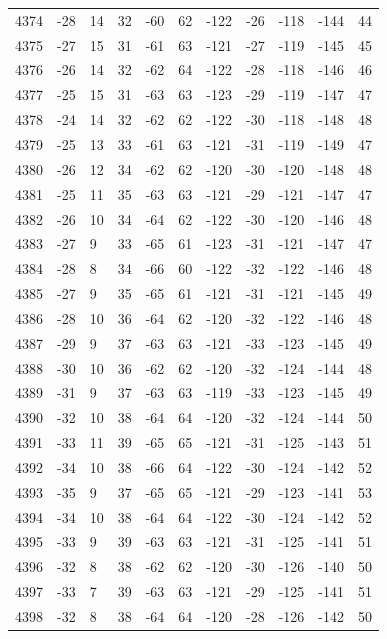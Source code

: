 \begin{table}[H]
\begin{tabular}{lllllllllll}
4374 & -28 & 14 & 32 & -60 & 62 & -122 & -26 & -118 & -144 & 44 \\
4375 & -27 & 15 & 31 & -61 & 63 & -121 & -27 & -119 & -145 & 45 \\
4376 & -26 & 14 & 32 & -62 & 64 & -122 & -28 & -118 & -146 & 46 \\
4377 & -25 & 15 & 31 & -63 & 63 & -123 & -29 & -119 & -147 & 47 \\
4378 & -24 & 14 & 32 & -62 & 62 & -122 & -30 & -118 & -148 & 48 \\
4379 & -25 & 13 & 33 & -61 & 63 & -121 & -31 & -119 & -149 & 47 \\
4380 & -26 & 12 & 34 & -62 & 62 & -120 & -30 & -120 & -148 & 48 \\
4381 & -25 & 11 & 35 & -63 & 63 & -121 & -29 & -121 & -147 & 47 \\
4382 & -26 & 10 & 34 & -64 & 62 & -122 & -30 & -120 & -146 & 48 \\
4383 & -27 & 9 & 33 & -65 & 61 & -123 & -31 & -121 & -147 & 47 \\
4384 & -28 & 8 & 34 & -66 & 60 & -122 & -32 & -122 & -146 & 48 \\
4385 & -27 & 9 & 35 & -65 & 61 & -121 & -31 & -121 & -145 & 49 \\
4386 & -28 & 10 & 36 & -64 & 62 & -120 & -32 & -122 & -146 & 48 \\
4387 & -29 & 9 & 37 & -63 & 63 & -121 & -33 & -123 & -145 & 49 \\
4388 & -30 & 10 & 36 & -62 & 62 & -120 & -32 & -124 & -144 & 48 \\
4389 & -31 & 9 & 37 & -63 & 63 & -119 & -33 & -123 & -145 & 49 \\
4390 & -32 & 10 & 38 & -64 & 64 & -120 & -32 & -124 & -144 & 50 \\
4391 & -33 & 11 & 39 & -65 & 65 & -121 & -31 & -125 & -143 & 51 \\
4392 & -34 & 10 & 38 & -66 & 64 & -122 & -30 & -124 & -142 & 52 \\
4393 & -35 & 9 & 37 & -65 & 65 & -121 & -29 & -123 & -141 & 53 \\
4394 & -34 & 10 & 38 & -64 & 64 & -122 & -30 & -124 & -142 & 52 \\
4395 & -33 & 9 & 39 & -63 & 63 & -121 & -31 & -125 & -141 & 51 \\
4396 & -32 & 8 & 38 & -62 & 62 & -120 & -30 & -126 & -140 & 50 \\
4397 & -33 & 7 & 39 & -63 & 63 & -121 & -29 & -125 & -141 & 51 \\
4398 & -32 & 8 & 38 & -64 & 64 & -120 & -28 & -126 & -142 & 50 \\

\end{tabular}
\end{table}
